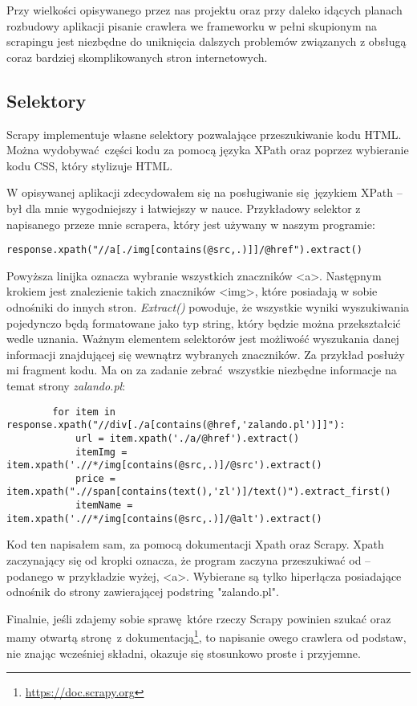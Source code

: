 Przy wielkości opisywanego przez nas projektu oraz przy daleko idących planach rozbudowy aplikacji pisanie crawlera we frameworku w pełni skupionym na scrapingu jest niezbędne do uniknięcia dalszych problemów związanych z obsługą coraz bardziej skomplikowanych stron internetowych.
\subsection{Selektory}

Scrapy implementuje własne selektory pozwalające przeszukiwanie kodu HTML.
Można wydobywać części kodu za pomocą języka XPath oraz poprzez wybieranie kodu CSS, który stylizuje HTML\cite{Scrapy1691:online}.

W opisywanej aplikacji zdecydowałem się na posługiwanie się językiem XPath -- był dla mnie wygodniejszy i łatwiejszy w nauce.
Przykładowy selektor z napisanego przeze mnie scrapera, który jest używany w naszym programie:
\begin{lstlisting}
response.xpath("//a[./img[contains(@src,.)]]/@href").extract()
\end{lstlisting}
Powyższa linijka oznacza wybranie wszystkich znaczników \textless a\textgreater. Następnym krokiem jest znalezienie takich znaczników \textless img\textgreater, które posiadają w sobie odnośniki do innych stron\cite{Selector73:online}. 
\emph{Extract()} powoduje, że wszystkie wyniki wyszukiwania pojedynczo będą formatowane jako typ string, który będzie można przekształcić wedle uznania.
Ważnym elementem selektorów jest możliwość wyszukania danej informacji znajdującej się wewnątrz wybranych znaczników.
Za przykład posłuży mi fragment kodu. Ma on za zadanie zebrać wszystkie niezbędne informacje na temat strony \emph{zalando.pl}:
\begin{lstlisting}
        for item in response.xpath("//div[./a[contains(@href,'zalando.pl')]]"):
            url = item.xpath('./a/@href').extract()
            itemImg = item.xpath('.//*/img[contains(@src,.)]/@src').extract()
            price = item.xpath(".//span[contains(text(),'zl')]/text()").extract_first()
            itemName = item.xpath('.//*/img[contains(@src,.)]/@alt').extract()
\end{lstlisting}\cite{SplashAj41:online}

Kod ten napisałem sam, za pomocą dokumentacji Xpath oraz Scrapy. Xpath zaczynający się od kropki oznacza, że program zaczyna przeszukiwać od -- podanego w przykładzie wyżej, \textless a\textgreater. Wybierane są tylko hiperłącza posiadające odnośnik do strony zawierającej podstring "zalando.pl".

Finalnie, jeśli zdajemy sobie sprawę które rzeczy Scrapy powinien szukać oraz mamy otwartą stronę z dokumentacją\footnote{\url{https://doc.scrapy.org}}, to napisanie owego crawlera od podstaw, nie znając wcześniej składni, okazuje się stosunkowo proste i przyjemne.
